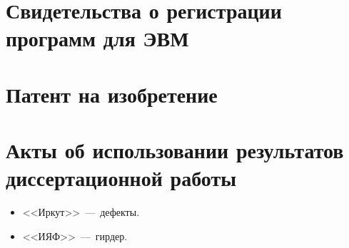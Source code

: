 \chapter{Свидетельства о регистрации программ для ЭВМ} 











\chapter{Патент на изобретение} 



\chapter{Акты об использовании результатов диссертационной работы} 



\begin{itemize}
	\item <<Иркут>>~---~дефекты.
	\item <<ИЯФ>>~---~гирдер.
\end{itemize}
